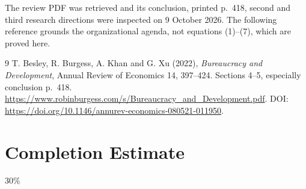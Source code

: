\documentclass[11pt]{article}
\begin{document}
The review PDF was retrieved and its conclusion, printed p.~418, second
and third research directions were inspected on 9 October 2026. The
following reference grounds the organizational agenda, not equations
(1)--(7), which are proved here.
\begin{thebibliography}{9}
 T. Besley, R. Burgess, A. Khan and G. Xu (2022),
\emph{Bureaucracy and Development}, Annual Review of Economics 14,
397--424. Sections 4--5, especially conclusion p.~418.
\url{https://www.robinburgess.com/s/Bureaucracy_and_Development.pdf}.
DOI: \url{https://doi.org/10.1146/annurev-economics-080521-011950}.
\end{thebibliography}

\section{Completion Estimate}
30\%
\end{document}
